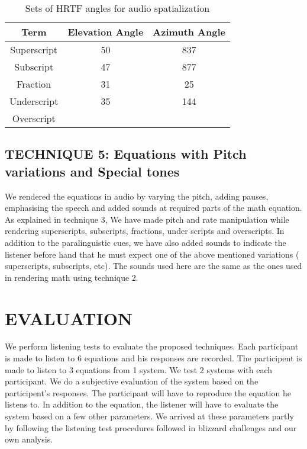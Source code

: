 \documentclass{article}
\begin{document}
\begin{table}[t]
\caption{Sets of HRTF angles for audio spatialization}

\vspace{8pt} %

\centering
\begin{tabular}{c c c }
\hline\hline %
Term & Elevation Angle & Azimuth Angle \\[0.5ex]
\hline
Superscript & 50 & 837  \\
Subscript & 47 & 877  \\
Fraction & 31 & 25  \\
Underscript & 35 & 144  \\
Overscript \\ [1ex]
\hline


\end{tabular}
\end{table}


\subsection{TECHNIQUE 5: Equations with Pitch variations and Special tones}
\label{ssec:subhead}


We rendered the equations in audio by varying the pitch, adding pauses, emphasising the speech and added sounds at required parts of the math equation. As explained in technique 3, We have made pitch and rate manipulation while rendering superscripts, subscripts, fractions, under scripts and overscripts. In addition to the paralinguistic cues, we have also added sounds to indicate the listener before hand that he must expect one of the above mentioned variations ( superscripts, subscripts, etc). The sounds used here are the same as the ones used in rendering math using technique 2.


 
\section{EVALUATION}
\label{sec:subsubhead}

We perform listening tests to evaluate the proposed techniques. Each participant is made to listen to 6 equations and his responses are recorded. The participent is made to listen to 3 equations from 1 system. We test 2 systems with each participant. We do a subjective evaluation of the system based on the participent’s responses. The participant will have to reproduce the equation he listens to. In addition to the equation, the listener will have to evaluate the system based on a few other parameters. We arrived at these parameters partly by following the listening test procedures followed in blizzard challenges and our own analysis.
\end{document}
